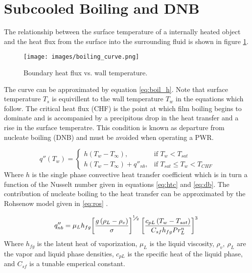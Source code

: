\section{Subcooled Boiling and DNB}

The relationship between the surface temperature of a internally heated object and the heat flux from the surface into the surrounding fluid is shown in figure \ref{fig:boiling_curve}.

\begin{figure}[!htbp]
\centering
\texttt{[image: images/boiling\_curve.png]}
\caption{Boundary heat flux vs. wall temperature.}
\label{fig:boiling_curve}
\end{figure}

The curve can be approximated by equation \ref{eq:boil_h}.  Note that surface temperature $T_s$ is equivillent to the wall temperature $T_w$ in the equations which follow.
The critical heat flux (CHF) is the point at which film boiling begins to dominate and is accompanied by a precipitous drop in the heat transfer and a rise in the surface temperatre.  This condition is known as departure from nucleate boiling (DNB) and must be avoided when operating a PWR.

\begin{equation}
q''(T_w) = 
\begin{cases}
      h(T_w-T_{\infty}), & \mbox{if } T_w < T_{sat} \\
      h(T_w-T_{\infty}) + q''_{nb} ,  & \mbox{if } T_{sat} \leq T_w < T_{CHF} 
\end{cases}
\label{eq:boil_h}
\end{equation}
Where $h$ is the single phase convective heat transfer coefficient which is in turn a function of the Nusselt number given in equations \ref{eq:htc} and \ref{eq:db}.  The contribution of nucleate boiling to the heat transfer can be approximated by the Rohsenow model given in \ref{eq:ros} \cite{rohsenow51}.

\begin{equation}
q''_{nb} = {{\mu }_{L}}{{h}_{fg}}{{\left[ \frac{g\left( {{\rho }_{L}}-{{\rho }_{v}} \right)}{\sigma } \right]}^{{}^{1}\!\!\diagup\!\!{}_{2}\;}}{{\left[ \frac{{{c}_{pL}}\left( {{T}_{w}}-{{T}_{sat}} \right)}{{{C}_{sf}}{{h}_{fg}}Pr_{L}^{n}} \right]}^{3}\;}
\label{eq:ros}
\end{equation}
Where $h_{fg}$ is the latent heat of vaporization, $\mu_L$ is the liquid viscosity, $\rho_v,\ \rho_L$ are the vapor and liquid phase densities, ${c}_{pL}$ is the specific heat of the liquid phase, and ${C}_{sf}$ is a tunable emperical constant.

